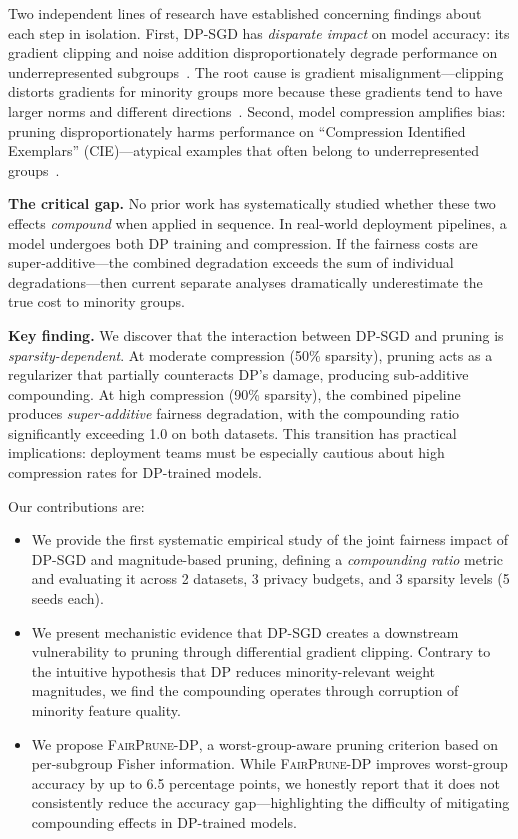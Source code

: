 \documentclass{article}
\newcommand{\FairPrunDP}{\textsc{FairPrune-DP}}
\begin{document}
Two independent lines of research have established concerning findings about each step in isolation. First, DP-SGD has \emph{disparate impact} on model accuracy: its gradient clipping and noise addition disproportionately degrade performance on underrepresented subgroups~\citep{bagdasaryan2019differential, esipova2023disparate}. The root cause is gradient misalignment---clipping distorts gradients for minority groups more because these gradients tend to have larger norms and different directions~\citep{esipova2023disparate}. Second, model compression amplifies bias: pruning disproportionately harms performance on ``Compression Identified Exemplars'' (CIE)---atypical examples that often belong to underrepresented groups~\citep{hooker2020characterising, iofinova2023bias}.

\textbf{The critical gap.} No prior work has systematically studied whether these two effects \emph{compound} when applied in sequence. In real-world deployment pipelines, a model undergoes both DP training and compression. If the fairness costs are super-additive---the combined degradation exceeds the sum of individual degradations---then current separate analyses dramatically underestimate the true cost to minority groups.

\textbf{Key finding.} We discover that the interaction between DP-SGD and pruning is \emph{sparsity-dependent}. At moderate compression (50\% sparsity), pruning acts as a regularizer that partially counteracts DP's damage, producing sub-additive compounding. At high compression (90\% sparsity), the combined pipeline produces \emph{super-additive} fairness degradation, with the compounding ratio significantly exceeding 1.0 on both datasets. This transition has practical implications: deployment teams must be especially cautious about high compression rates for DP-trained models.

Our contributions are:
\begin{itemize}
    \item We provide the first systematic empirical study of the joint fairness impact of DP-SGD and magnitude-based pruning, defining a \emph{compounding ratio} metric and evaluating it across 2 datasets, 3 privacy budgets, and 3 sparsity levels (5 seeds each).
    \item We present mechanistic evidence that DP-SGD creates a downstream vulnerability to pruning through differential gradient clipping. Contrary to the intuitive hypothesis that DP reduces minority-relevant weight magnitudes, we find the compounding operates through corruption of minority feature quality.
    \item We propose \FairPrunDP{}, a worst-group-aware pruning criterion based on per-subgroup Fisher information. While \FairPrunDP{} improves worst-group accuracy by up to 6.5 percentage points, we honestly report that it does not consistently reduce the accuracy gap---highlighting the difficulty of mitigating compounding effects in DP-trained models.
\end{itemize}
\end{document}
